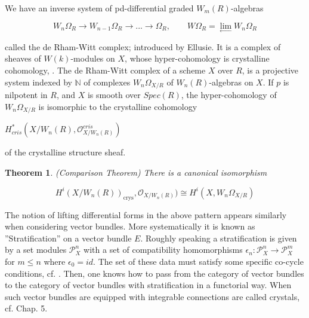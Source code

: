 \documentclass[12pt,twoside]{amsart}
\newtheorem{theorem}{Theorem}[section]
\begin{document}
\noindent
We have an inverse system of pd-differential graded $W_m(R)$-algebras

\[ W_n\Omega_{R} \to W_{n-1}\Omega_R \to ... \to \Omega_R , \qquad W\Omega_{R}= \lim_{\leftarrow}W_n\Omega_{R} \]

\vspace{0.5cm}

\noindent
called the de Rham-Witt complex; introduced by Ellusie. It is a complex of sheaves of $W(k)$-modules on $X$, whose hyper-cohomology is crystalline cohomology, \cite{LZ}. The de Rham-Witt complex of a scheme $X$ over $R$, is a projective system indexed by $\mathbb{N}$ of complexes $W_n\Omega_{X/R}$ of $W_n(R)$-algebras on $X$. If $p$ is nilpotent in $R$, and $X$ is smooth over $Spec(R)$, the hyper-cohomology of $W_n\Omega_{X/R}$ is isomorphic to the crystalline cohomology

\vspace{0.5cm}
 
\begin{center}
$H_{cris}^*(X/W_n(R),\mathcal{O}_{X/W_n(R)}^{cris})$ 
\end{center}

\vspace{0.5cm}

\noindent
of the crystalline structure sheaf. 

\vspace{0.5cm}

\begin{theorem} (Comparison Theorem) \cite{LZ}
There is a canonical isomorphism 

\begin{equation} 
H^i(X/W_n(R))_{\text{crys}}, \mathcal{O}_{X/W_n(R)}) \cong H^i(X,W_n\Omega_{X/R}) 
\end{equation}

\end{theorem}
 
\vspace{0.5cm} 

\noindent
The notion of lifting differential forms in the above pattern appears similarly when considering vector bundles.
More systematically it is known as ''Stratification'' on a vector bundle $E$. Roughly speaking a stratification is given by a set modules $\mathcal{P}_X^n$ with a set of compatibility homomorphisms $\epsilon_n:\mathcal{P}_X^n \to \mathcal{P}_X^m$ for $m \leq n$ where $\epsilon_0=id$. The set of these data must satisfy some specific co-cycle conditions, cf. \cite{BEO}. Then, one knows how to pass from the category of vector bundles to the category of vector bundles with stratification in a functorial way.
When such vector bundles are equipped with integrable connections are called crystals, cf. \cite{BEO} Chap. 5.   
\end{document}
